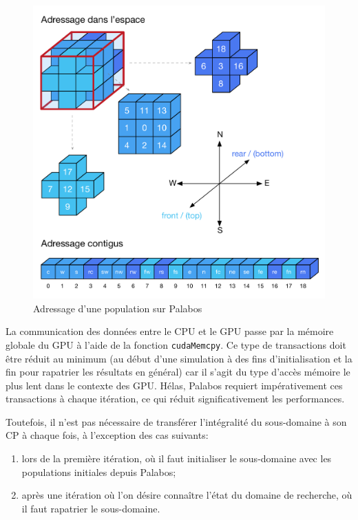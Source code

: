 \begin{figure}[h]
	\centering
	\includegraphics[scale=0.85, fbox]{images/index_population_palabos.pdf}
	\caption{Adressage d'une population sur Palabos}
	\label{fig:plb_population_index}
\end{figure}

La communication des données entre le \acs{CPU} et le \acs{GPU} passe par la mémoire globale du \acs{GPU} à l'aide de la fonction \texttt{cudaMemcpy}. Ce type de transactions doit être réduit au minimum (au début d'une simulation à des fins d'initialisation et la fin pour rapatrier les résultats en général) car il s'agit du type d'accès mémoire le plus lent dans le contexte des \acs{GPU}. Hélas, Palabos requiert impérativement ces transactions à chaque itération, ce qui réduit significativement les performances.

Toutefois, il n'est pas nécessaire de transférer l'intégralité du sous-domaine à son \ac{CP} à chaque fois, à l'exception des cas suivants:
\begin{enumerate}
\item lors de la première itération, où il faut initialiser le sous-domaine avec les populations initiales depuis Palabos;
\item après une itération où l'on désire connaître l'état du domaine de recherche, où il faut rapatrier le sous-domaine.
\end{enumerate}

